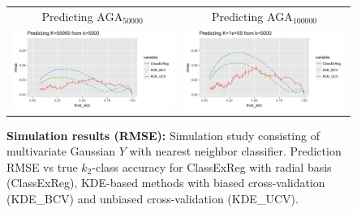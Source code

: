 \documentclass[twoside,11pt]{article}
\newenvironment{myfont}{\fontfamily{phv}\selectfont}{\par}
\begin{document}
\begin{figure}[p]
\begin{tabular}{cc}
\begin{myfont}Predicting $\text{AGA}_{50000}$\end{myfont} &
\begin{myfont}Predicting $\text{AGA}_{100000}$\end{myfont}\\
\includegraphics[scale = 0.5, clip = true, trim = 0 0 1.25in 0.45in]{sim_large7_K50_k5.png} &
\includegraphics[scale = 0.5, clip = true, trim = 0 0 0 0.45in]{sim_large7_K100_k5.png}\\
\end{tabular}
\caption{\textbf{Simulation results (RMSE):} Simulation study consisting of
  multivariate Gaussian $Y$ with nearest neighbor classifier.
  Prediction RMSE vs true $k_2$-class accuracy for ClassExReg with radial basis
  (\textsf{ClassExReg}), KDE-based methods with biased cross-validation
  (\textsf{KDE\_BCV}) and unbiased cross-validation (\textsf{KDE\_UCV}).}
\label{fig:sim_study}
\end{figure}
\end{document}
